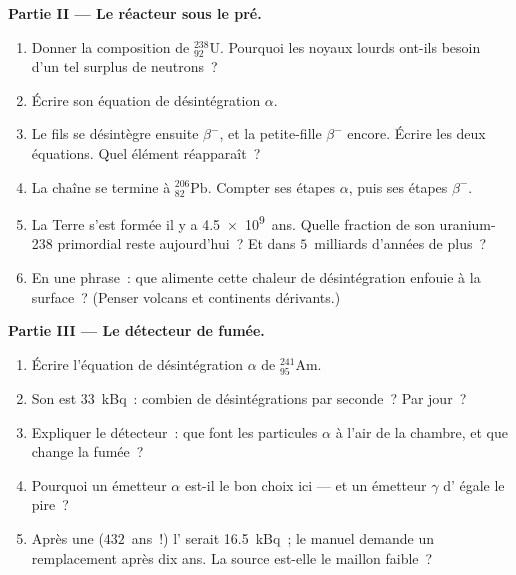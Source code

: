 \begin{problem}
\medskip
\noindent\textbf{Partie II --- Le réacteur sous le pré.}
\begin{enumerate}[resume]
  \item Donner la composition de ${}^{238}_{92}\mathrm{U}$. Pourquoi les
        noyaux lourds ont-ils besoin d'un tel surplus de neutrons~?
  \item Écrire son équation de désintégration $\alpha$.
  \item Le  fils se désintègre ensuite $\beta^-$, et la
        petite-fille $\beta^-$ encore. Écrire les deux équations. Quel
        élément réapparaît~?
  \item La chaîne se termine à ${}^{206}_{82}\mathrm{Pb}$. Compter ses
        étapes $\alpha$, puis ses étapes $\beta^-$.
  \item La Terre s'est formée il y a \num{4.5e9}~ans. Quelle fraction de
        son uranium-238 primordial reste aujourd'hui~? Et dans
        $5$~milliards d'années de plus~?
  \item En une phrase~: que alimente cette
        chaleur de désintégration enfouie à la surface~? (Penser
        volcans et continents dérivants.)
\end{enumerate}

\medskip
\noindent\textbf{Partie III --- Le détecteur de fumée.}
\begin{enumerate}[resume]
  \item Écrire l'équation de désintégration $\alpha$ de
        ${}^{241}_{95}\mathrm{Am}$.
  \item Son  est
        \qty{33}{kBq}~: combien de désintégrations par seconde~? Par
        jour~?
  \item Expliquer le détecteur~: que font les particules $\alpha$ à
        l'air de la chambre, et que change la fumée~?
  \item Pourquoi un émetteur $\alpha$ est-il le bon choix ici --- et un
        émetteur $\gamma$ d'
         égale le pire~?
  \item Après une 
        ($432$~ans~!) l'
        serait \qty{16.5}{kBq}~; le manuel demande un remplacement après
        dix ans. La source est-elle le maillon faible~?
\end{enumerate}


\end{problem}
